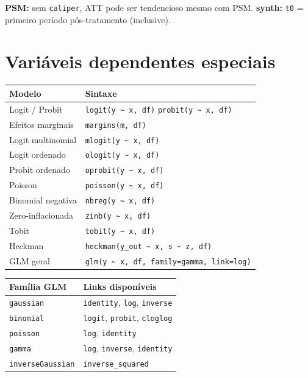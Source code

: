 {\footnotesize \textbf{PSM:} sem \texttt{caliper}, ATT pode ser tendencioso mesmo com PSM.
\textbf{synth:} \texttt{t0} = primeiro período pós-tratamento (inclusive).}

\section{Variáveis dependentes especiais}

\begin{center}
\begin{tabular}{ll}
\toprule
\textbf{Modelo} & \textbf{Sintaxe} \\
\midrule
Logit / Probit     & \texttt{logit(y \textasciitilde{} x, df)} \quad \texttt{probit(y \textasciitilde{} x, df)} \\
Efeitos marginais  & \texttt{margins(m, df)} \\
Logit multinomial  & \texttt{mlogit(y \textasciitilde{} x, df)} \\
Logit ordenado     & \texttt{ologit(y \textasciitilde{} x, df)} \\
Probit ordenado    & \texttt{oprobit(y \textasciitilde{} x, df)} \\
\midrule
Poisson            & \texttt{poisson(y \textasciitilde{} x, df)} \\
Binomial negativa  & \texttt{nbreg(y \textasciitilde{} x, df)} \\
Zero-inflacionada  & \texttt{zinb(y \textasciitilde{} x, df)} \\
\midrule
Tobit              & \texttt{tobit(y \textasciitilde{} x, df)} \\
Heckman            & \texttt{heckman(y\_out \textasciitilde{} x, s \textasciitilde{} z, df)} \\
\midrule
GLM geral          & \texttt{glm(y \textasciitilde{} x, df, family=gamma, link=log)} \\
\bottomrule
\end{tabular}
\end{center}

\begin{center}
\begin{tabular}{ll}
\toprule
\textbf{Família GLM} & \textbf{Links disponíveis} \\
\midrule
\texttt{gaussian}  & \texttt{identity}, \texttt{log}, \texttt{inverse} \\
\texttt{binomial}  & \texttt{logit}, \texttt{probit}, \texttt{cloglog} \\
\texttt{poisson}   & \texttt{log}, \texttt{identity} \\
\texttt{gamma}     & \texttt{log}, \texttt{inverse}, \texttt{identity} \\
\texttt{inverseGaussian} & \texttt{inverse\_squared} \\
\bottomrule
\end{tabular}
\end{center}


